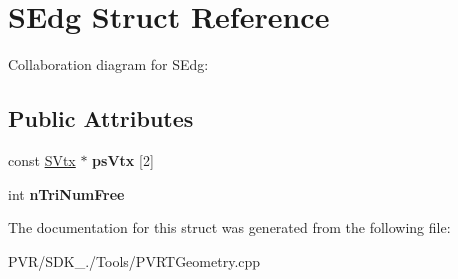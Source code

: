 \hypertarget{struct_s_edg}{\section{S\+Edg Struct Reference}
\label{struct_s_edg}
}


Collaboration diagram for S\+Edg\+:
\subsection*{Public Attributes}
\begin{DoxyCompactItemize}
\item 
\hypertarget{struct_s_edg_a93b5afc018b0b4c73f31c6a1ee32e281}{const \hyperlink{struct_s_vtx}{S\+Vtx} $\ast$ {\bfseries ps\+Vtx} \mbox{[}2\mbox{]}}\label{struct_s_edg_a93b5afc018b0b4c73f31c6a1ee32e281}

\item 
\hypertarget{struct_s_edg_afef235ac0787bc064f68d82e88bc0571}{int {\bfseries n\+Tri\+Num\+Free}}\label{struct_s_edg_afef235ac0787bc064f68d82e88bc0571}

\end{DoxyCompactItemize}


The documentation for this struct was generated from the following file\+:\begin{DoxyCompactItemize}
\item 
P\+V\+R/\+S\+D\+K\+\_./\+Tools/P\+V\+R\+T\+Geometry.\+cpp\end{DoxyCompactItemize}
